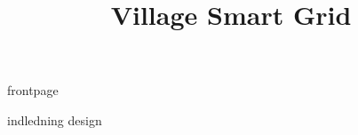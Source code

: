 \documentclass[a4paper]{article}								%
\title{Village Smart Grid}
\begin{document}

	{frontpage}

	\tableofcontents\thispagestyle{fancy} \newpage


	{indledning} \newpage
	{design} \newpage


\end{document}
